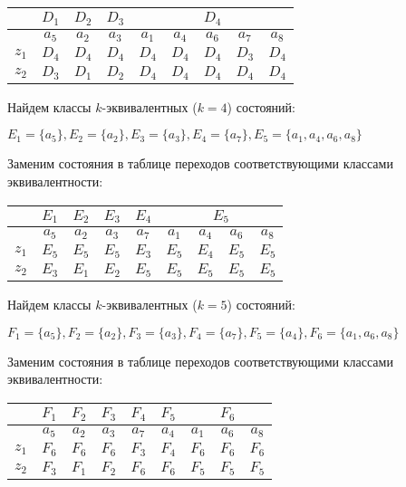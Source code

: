 \documentclass[listings]{labreport}
\begin{document}
\begin{tabular}{|*{9}{c|}}
\hline
      & $D_1$ & $D_2$ & $D_3$ & \multicolumn{5}{c|}{$D_4$}\\\hline
      & $a_5$ & $a_2$ & $a_3$ & $a_1$ & $a_4$ & $a_6$ & $a_7$ & $a_8$\\\hline
$z_1$ & $D_4$ & $D_4$ & $D_4$ & $D_4$ & $D_4$ & $D_4$ & $D_3$ & $D_4$\\\hline
$z_2$ & $D_3$ & $D_1$ & $D_2$ & $D_4$ & $D_4$ & $D_4$ & $D_4$ & $D_4$\\\hline
\end{tabular}

Найдем классы $k$-эквивалентных ($k=4$) состояний:

$E_1 = \{a_5\}, E_2 = \{a_2\}, E_3 = \{a_3\}, E_4 = \{a_7\}, E_5 = \{a_1, a_4, a_6, a_8\}$

Заменим состояния в таблице переходов соответствующими классами эквивалентности:

\begin{tabular}{|*{9}{c|}}
\hline
      & $E_1$ & $E_2$ & $E_3$ & $E_4$ & \multicolumn{4}{c|}{$E_5$}\\\hline
      & $a_5$ & $a_2$ & $a_3$ & $a_7$ & $a_1$ & $a_4$ & $a_6$ & $a_8$\\\hline
$z_1$ & $E_5$ & $E_5$ & $E_5$ & $E_3$ & $E_5$ & $E_4$ & $E_5$ & $E_5$\\\hline
$z_2$ & $E_3$ & $E_1$ & $E_2$ & $E_5$ & $E_5$ & $E_5$ & $E_5$ & $E_5$\\\hline
\end{tabular}

Найдем классы $k$-эквивалентных ($k=5$) состояний:

$F_1 = \{a_5\}, F_2 = \{a_2\}, F_3 = \{a_3\}, F_4 = \{a_7\}, F_5 = \{a_4\}, F_6 = \{a_1, a_6, a_8\}$

Заменим состояния в таблице переходов соответствующими классами эквивалентности:

\begin{tabular}{|*{9}{c|}}
\hline
      & $F_1$ & $F_2$ & $F_3$ & $F_4$ & $F_5$ & \multicolumn{3}{c|}{$F_6$}\\\hline
      & $a_5$ & $a_2$ & $a_3$ & $a_7$ & $a_4$ & $a_1$ & $a_6$ & $a_8$\\\hline
$z_1$ & $F_6$ & $F_6$ & $F_6$ & $F_3$ & $F_4$ & $F_6$ & $F_6$ & $F_6$\\\hline
$z_2$ & $F_3$ & $F_1$ & $F_2$ & $F_6$ & $F_6$ & $F_5$ & $F_5$ & $F_5$\\\hline
\end{tabular}
\end{document}
